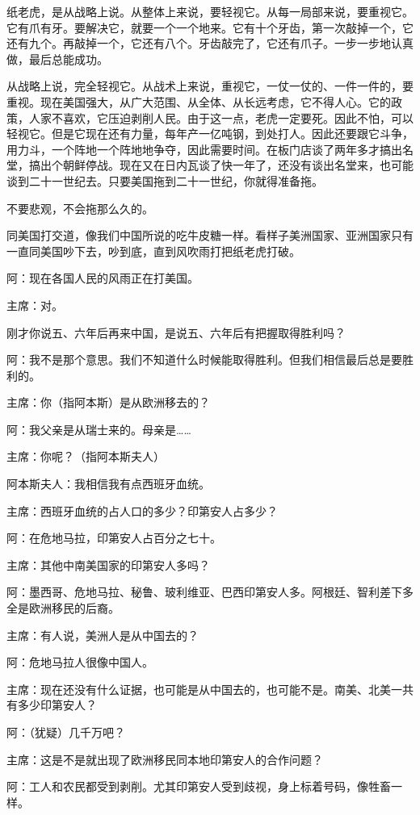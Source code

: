 纸老虎，是从战略上说。从整体上来说，要轻视它。从每一局部来说，要重视它。它有爪有牙。要解决它，就要一个一个地来。它有十个牙齿，第一次敲掉一个，它还有九个。再敲掉一个，它还有八个。牙齿敲完了，它还有爪子。一步一步地认真做，最后总能成功。

从战略上说，完全轻视它。从战术上来说，重视它，一仗一仗的、一件一件的，要重视。现在美国强大，从广大范围、从全体、从长远考虑，它不得人心。它的政策，人家不喜欢，它压迫剥削人民。由于这一点，老虎一定要死。因此不怕，可以轻视它。但是它现在还有力量，每年产一亿吨钢，到处打人。因此还要跟它斗争，用力斗，一个阵地一个阵地地争夺，因此需要时间。在板门店谈了两年多才搞出名堂，搞出个朝鲜停战。现在又在日内瓦谈了快一年了，还没有谈出名堂来，也可能谈到二十一世纪去。只要美国拖到二十一世纪，你就得准备拖。

不要悲观，不会拖那么久的。

同美国打交道，像我们中国所说的吃牛皮糖一样。看样子美洲国家、亚洲国家只有一直同美国吵下去，吵到底，直到风吹雨打把纸老虎打破。

阿：现在各国人民的风雨正在打美国。

主席：对。

刚才你说五、六年后再来中国，是说五、六年后有把握取得胜利吗？

阿：我不是那个意思。我们不知道什么时候能取得胜利。但我们相信最后总是要胜利的。

主席：你（指阿本斯）是从欧洲移去的？

阿：我父亲是从瑞士来的。母亲是……

主席：你呢？（指阿本斯夫人）

阿本斯夫人：我相信我有点西班牙血统。

主席：西班牙血统的占人口的多少？印第安人占多少？

阿：在危地马拉，印第安人占百分之七十。

主席：其他中南美国家的印第安人多吗？

阿：墨西哥、危地马拉、秘鲁、玻利维亚、巴西印第安人多。阿根廷、智利差下多全是欧洲移民的后裔。

主席：有人说，美洲人是从中国去的？

阿：危地马拉人很像中国人。

主席：现在还没有什么证据，也可能是从中国去的，也可能不是。南美、北美一共有多少印第安人？

阿：（犹疑）几千万吧？

主席：这是不是就出现了欧洲移民同本地印第安人的合作问题？

阿：工人和农民都受到剥削。尤其印第安人受到歧视，身上标着号码，像牲畜一样。


